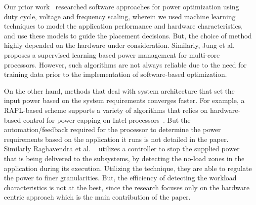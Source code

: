 Our prior work~\cite{caglar2014iplace} researched software approaches for power optimization using duty cycle, voltage and frequency scaling, wherein we used machine learning techniques to model the application performance and hardware characteristics, and use these models to guide the placement decisions.
But, the choice of method highly depended on the hardware under consideration.
Similarly, Jung et al. \cite{jung2010supervised} proposes a supervised learning based power management for multi-core processors. However, such algorithms are not always reliable due to the need for training data prior to the implementation of software-based optimization. 

On the other hand, methods that deal with system architecture that set the input power based on the system requirements converges faster. For example, a RAPL-based scheme supports a variety of algorithms that relies on hardware-based control for power capping on Intel processors~\cite{david2010rapl}. But the automation/feedback required for the processor to determine the power requirements based on the application it runs is not detailed in the paper.
Similarly Raghavendra et al. ~\cite{raghavendra2008no} utilizes a controller to stop the supplied power that is being delivered to the subsystems, by detecting the no-load zones in the application during its execution. Utilizing the technique, they are able to regulate the power to finer granularities. But, the efficiency of detecting the workload characteristics is not at the best, since the research focuses only on the hardware centric approach which is the main contribution of the paper.


